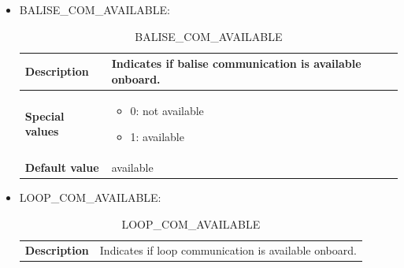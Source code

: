 \documentclass{template/openetcs}
\begin{document}
	\begin{itemize}
		\item BALISE\_COM\_AVAILABLE:
		
			\begin{longtable}{|l|l|}
				\caption{BALISE\_COM\_AVAILABLE}\\ 
				\hline
				
					\begin{minipage}[t]{0.22\linewidth} \textbf{Description}	\end{minipage} 
				&	\begin{minipage}[t]{0.78\linewidth} Indicates if balise communication is available onboard. \end{minipage} \\
				
				\hline
																																									
					\begin{minipage}[t]{0.22\linewidth} \textbf{Special values}	\end{minipage} 
				&	\begin{minipage}[t]{0.78\linewidth} \begin{itemize} \item 0: not available \item 1: available \end{itemize} \end{minipage} \\
				
				\hline
				
					\begin{minipage}[t]{0.22\linewidth} \textbf{Default value}	\end{minipage} 
				&	\begin{minipage}[t]{0.78\linewidth} available \end{minipage} \\
				
				\hline
				
			\end{longtable}
			
		\item LOOP\_COM\_AVAILABLE:
				
			\begin{longtable}{|l|l|}
				\caption{LOOP\_COM\_AVAILABLE}\\ 
				\hline
				
					\begin{minipage}[t]{0.22\linewidth} \textbf{Description}	\end{minipage} 
				&	\begin{minipage}[t]{0.78\linewidth} Indicates if loop communication is available onboard. \end{minipage} \\
				

\end{longtable}
\end{itemize}
\end{document}
